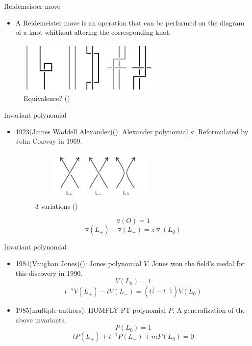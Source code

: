 \begin{frame}{Reidemeister move}
	\begin{itemize}
		\item A Reidemeister move is an operation that can be performed on the diagram
		of a knot whithout altering the corresponding knot.
	\end{itemize}
	\begin{figure}
		\centering
		\includegraphics[width=7cm]{Pictures/r.png}
		\caption{Equivalence? (\cite{reidemeister})}
		\label{fig:enter-label}
	\end{figure}
	
\end{frame}

\begin{frame}{Invariant polynomial}
	\begin{itemize}
		\item 1923(James Waddell Alexander)(\cite{Alexander}): Alexander polynomial $\triangledown$. Reformulated by John Conway in 1969.
		\begin{figure}
			\centering
			\includegraphics[width =7cm, height = 2.5cm]{Pictures/L.png}
			\caption{3 variations (\cite{L+})}
			\label{fig:enter-label}
		\end{figure}
		$$\triangledown(O) = 1$$
		$$\triangledown(L_+) - \triangledown(L_-) = z\triangledown(L_0)$$
	\end{itemize}
\end{frame}

\begin{frame}{Invariant polynomial}
	\begin{itemize}
		\item 1984(Vaughan Jones)(\cite{Jones}): Jones polynomial $V$. Jones won the field's medal for this discovery in 1990.
		$$V(L_0) = 1$$
		$$t^{-1}V(L_+) - tV(L_-) = (t^{\frac{1}{2}} - t^{-\frac{1}{2}})V(L_0)$$
		\item 1985(multiple authors): HOMFLY-PT polynomial $P$: A generalization of the above invariants.
		$$P(L_0) = 1$$
		$$tP(L_+) + t^{-1}P(L_-) + mP(L_0) = 0$$
	\end{itemize}
\end{frame}